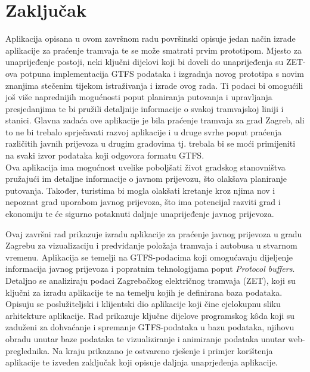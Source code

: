 \documentclass[zavrsnirad]{fer}
\begin{document}
\chapter{Zaključak}
\label{pog:zakljucak}
Aplikacija opisana u ovom završnom radu površinski opisuje jedan način izrade aplikacije za praćenje tramvaja te se može smatrati prvim prototipom. Mjesto za unaprijeđenje postoji, neki ključni dijelovi koji bi doveli do unaprijeđenja su ZET-ova potpuna implementacija GTFS podataka i izgradnja novog prototipa s novim znanjima stečenim tijekom istraživanja i izrade ovog rada. Ti podaci bi omogućili još više naprednijih mogućnosti poput planiranja putovanja i upravljanja presjedanjima te bi pružili detaljnije informacije o svakoj tramvajskoj liniji i stanici. Glavna zadaća ove aplikacije je bila praćenje tramvaja za grad Zagreb, ali to ne bi trebalo sprječavati razvoj aplikacije i u druge svrhe poput praćenja različitih javnih prijevoza u drugim gradovima tj. trebala bi se moći primijeniti na svaki izvor podataka koji odgovora formatu GTFS.\\
Ova aplikacija ima mogućnost uvelike poboljšati život gradskog stanovništva pružajući im detaljne informacije o javnom prijevozu, što olakšava planiranje putovanja. Također, turistima bi mogla olakšati kretanje kroz njima nov i nepoznat grad uporabom javnog prijevoza, što ima potencijal razviti grad i ekonomiju te će sigurno potaknuti daljnje unaprijeđenje javnog prijevoza.



\nocite{*}




\begin{sazetak}
	Ovaj završni rad prikazuje izradu aplikacije za praćenje javnog prijevoza u gradu Zagrebu za vizualizaciju i predviđanje položaja tramvaja i autobusa u stvarnom vremenu. Aplikacija se temelji na GTFS-podacima koji omogućavaju dijeljenje informacija javnog prijevoza i popratnim tehnologijama poput \textit{Protocol buffers}. Detaljno se analiziraju podaci Zagrebačkog električnog tramvaja (ZET), koji su ključni za izradu aplikacije te na temelju kojih je definirana baza podataka. Opisuju se poslužiteljski i klijentski dio aplikacije koji čine cjelokupnu sliku arhitekture aplikacije. Rad prikazuje ključne dijelove programskog k\^oda koji su zaduženi za dohvaćanje i spremanje GTFS-podataka u bazu podataka, njihovu obradu unutar baze podataka te vizualiziranje i animiranje podataka unutar web-preglednika. Na kraju prikazano je ostvareno rješenje i primjer korištenja aplikacije te izveden zaključak koji opisuje daljnja unaprjeđenja aplikacije.
\end{sazetak}
\end{document}
